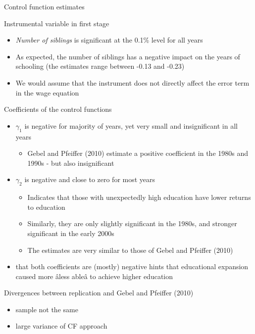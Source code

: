 \documentclass[10pt,ignorenonframetext,]{beamer}
\providecommand{\tightlist}{%
  \setlength{\itemsep}{0pt}\setlength{\parskip}{0pt}}
\begin{document}
\begin{frame}[allowframebreaks]{Control function estimates}
\protect\hypertarget{control-function-estimates}{}

Instrumental variable in first stage

\begin{itemize}
\tightlist
\item
  \emph{Number of siblings} is significant at the 0.1\% level for all
  years
\item
  As expected, the number of siblings has a negative impact on the years
  of schooling (the estimates range between -0.13 and -0.23)
\item
  We would assume that the instrument does not directly affect the error
  term in the wage equation
\end{itemize}

Coefficients of the control functions

\begin{itemize}
\tightlist
\item
  \(\gamma_1\) is negative for majority of years, yet very small and
  insignificant in all years

  \begin{itemize}
  \tightlist
  \item
    Gebel and Pfeiffer (2010) estimate a positive coefficient in the
    1980s and 1990s - but also insignificant
  \end{itemize}
\item
  \(\gamma_2\) is negative and close to zero for most years

  \begin{itemize}
  \tightlist
  \item
    Indicates that those with unexpectedly high education have lower
    returns to education
  \item
    Similarly, they are only slightly significant in the 1980s, and
    stronger significant in the early 2000s
  \item
    The estimates are very similar to those of Gebel and Pfeiffer (2010)
  \end{itemize}
\item
  that both coefficients are (mostly) negative hints that educational
  expansion caused more âless ableâ to achieve higher education
\end{itemize}

\end{frame}

\begin{frame}{Divergences between replication and Gebel and Pfeiffer
(2010)}
\protect\hypertarget{divergences-between-replication-and-gebel-and-pfeiffer-2010}{}

\begin{itemize}
\tightlist
\item
  sample not the same
\item
  large variance of CF approach
\end{itemize}

\end{frame}
\end{document}
